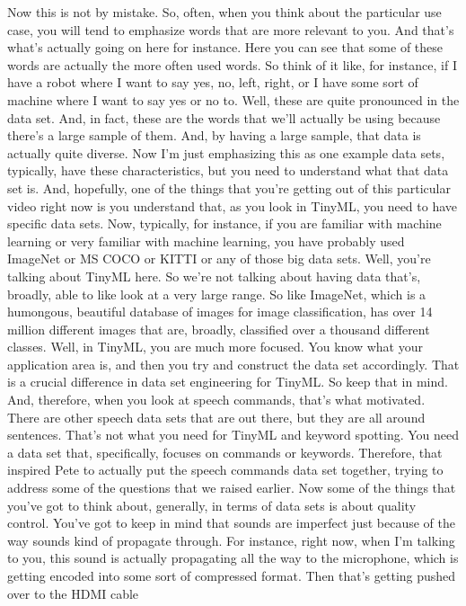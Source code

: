 Now this is not by mistake.
So, often, when you think about the particular use case,
you will tend to emphasize words that are more relevant to you.
And that's what's actually going on here for instance.
Here you can see that some of these words
are actually the more often used words.
So think of it like, for instance, if I have a robot where
I want to say yes, no, left, right, or I have some sort of machine where
I want to say yes or no to.
Well, these are quite pronounced in the data set.
And, in fact, these are the words that we'll actually
be using because there's a large sample of them.
And, by having a large sample, that data is actually quite diverse.
Now I'm just emphasizing this as one example data sets,
typically, have these characteristics, but you need
to understand what that data set is.
And, hopefully, one of the things that you're getting out
of this particular video right now is you
understand that, as you look in TinyML, you need to have specific data sets.
Now, typically, for instance, if you are familiar with machine learning
or very familiar with machine learning, you
have probably used ImageNet or MS COCO or KITTI or any of those big data sets.
Well, you're talking about TinyML here.
So we're not talking about having data that's, broadly, able
to like look at a very large range.
So like ImageNet, which is a humongous, beautiful database of images
for image classification, has over 14 million different images
that are, broadly, classified over a thousand different classes.
Well, in TinyML, you are much more focused.
You know what your application area is, and then
you try and construct the data set accordingly.
That is a crucial difference in data set engineering for TinyML.
So keep that in mind.
And, therefore, when you look at speech commands, that's what motivated.
There are other speech data sets that are out there,
but they are all around sentences.
That's not what you need for TinyML and keyword spotting.
You need a data set that, specifically, focuses on commands or keywords.
Therefore, that inspired Pete to actually put the speech commands
data set together, trying to address some of the questions
that we raised earlier.
Now some of the things that you've got to think about, generally, in terms
of data sets is about quality control.
You've got to keep in mind that sounds are imperfect
just because of the way sounds kind of propagate through.
For instance, right now, when I'm talking to you,
this sound is actually propagating all the way
to the microphone, which is getting encoded
into some sort of compressed format.
Then that's getting pushed over to the HDMI cable
